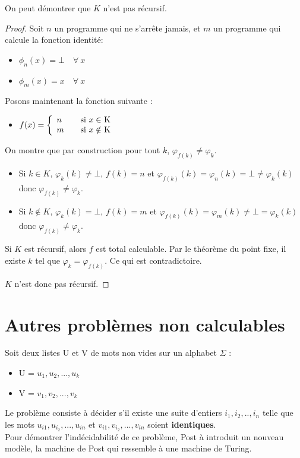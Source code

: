 \begin{myrem}
	On peut démontrer que $K$ n'est pas récursif.

    \begin{proof}
	Soit $n$ un programme qui ne s'arrête jamais, et $m$ un programme qui calcule la fonction identité:
		\begin{itemize}
		\item $\phi_n(x) = \bot \quad \forall \ x$
		\item $\phi_m(x) = x \quad \forall  \ x$
	\end{itemize}
	Posons maintenant la  fonction suivante :
	\begin{itemize}

		\item $ f(x) = \left\{
		\begin{array}{l l}
			n & \quad \text{si $x\in$ K}\\
    		m & \quad \text{si $x\notin$ K}
		\end{array} \right.$
	\end{itemize}

    On montre que par construction pour tout $k$, $\varphi_{f(k)} \neq \varphi_k$.
    \begin{itemize}
      \item Si $k \in K$, $\varphi_k(k) \neq \bot$, $f(k) = n$ et
        $\varphi_{f(k)}(k) = \varphi_n(k) = \bot \neq \varphi_k(k)$ donc $\varphi_{f(k)} \neq \varphi_k$.
      \item Si $k \notin K$, $\varphi_k(k) = \bot$, $f(k) = m$ et
        $\varphi_{f(k)}(k) = \varphi_m(k) \neq \bot = \varphi_k(k)$ donc $\varphi_{f(k)} \neq \varphi_k$.
    \end{itemize}
    Si $K$ est récursif, alors $f$ est total calculable.
	Par le théorème du point fixe, il existe $k$ tel que $\varphi_k = \varphi_{f(k)}$.
    Ce qui est contradictoire.

    $K$ n'est donc pas récursif.
  \end{proof}

\end{myrem}

\section{Autres problèmes non calculables}
\label{sec:autres_probl_mes_non_calculable}

\begin{mydef} Soit deux listes U et V
	de mots non vides sur un alphabet $\Sigma$ :
	\begin{itemize}
		\item U = ${u_1,u_2,...,u_k}$
		\item V = ${v_1,v_2,...,v_k}$
	\end{itemize}
	Le problème consiste à décider s’il existe une suite d'entiers
	$i_1,i_2,..,i_n$ telle que les mots $u_{i1},u_{i_2},...,u_{in}$ et
	$v_{i1},v_{i_2},...,v_{in}$ soient \textbf{identiques}. \\
	Pour démontrer l'indécidabilité de ce problème, Post à introduit un
	nouveau modèle, la machine de Post qui ressemble à une machine de Turing.
\end{mydef}

